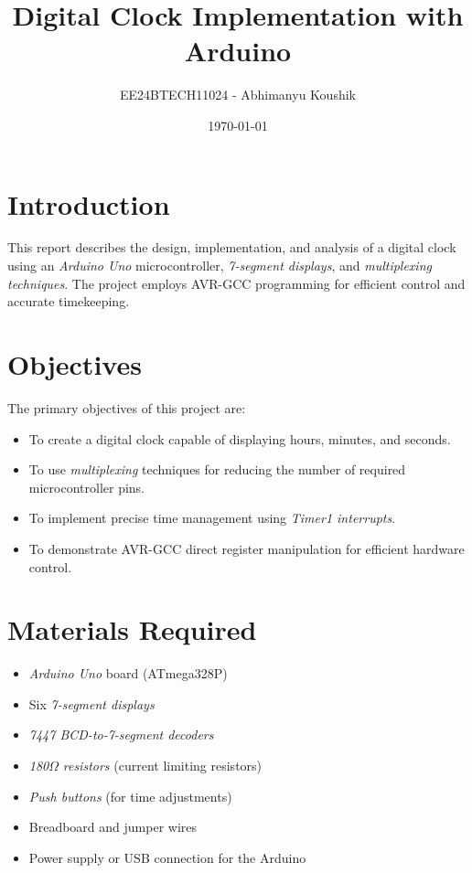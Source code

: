 \documentclass{article}
\title{Digital Clock Implementation with Arduino}
\author{EE24BTECH11024 - Abhimanyu Koushik}
\date{\today}
\begin{document}
\maketitle

\tableofcontents
\newpage

\section{Introduction}
This report describes the design, implementation, and analysis of a digital clock using an \textit{Arduino Uno} microcontroller, \textit{7-segment displays}, and \textit{multiplexing techniques}. The project employs AVR-GCC programming for efficient control and accurate timekeeping.

\section{Objectives}
The primary objectives of this project are:
\begin{itemize}
    \item To create a digital clock capable of displaying hours, minutes, and seconds.
    \item To use \textit{multiplexing} techniques for reducing the number of required microcontroller pins.
    \item To implement precise time management using \textit{Timer1 interrupts}.
    \item To demonstrate AVR-GCC direct register manipulation for efficient hardware control.
\end{itemize}

\section{Materials Required}
\begin{itemize}
    \item \textit{Arduino Uno} board (ATmega328P)
    \item Six \textit{7-segment displays}
    \item \textit{7447 BCD-to-7-segment decoders}
    \item \textit{180}$\Omega$ \textit{resistors} (current limiting resistors)
    \item \textit{Push buttons} (for time adjustments)
    \item Breadboard and jumper wires
    \item Power supply or USB connection for the Arduino
\end{itemize}
\end{document}
